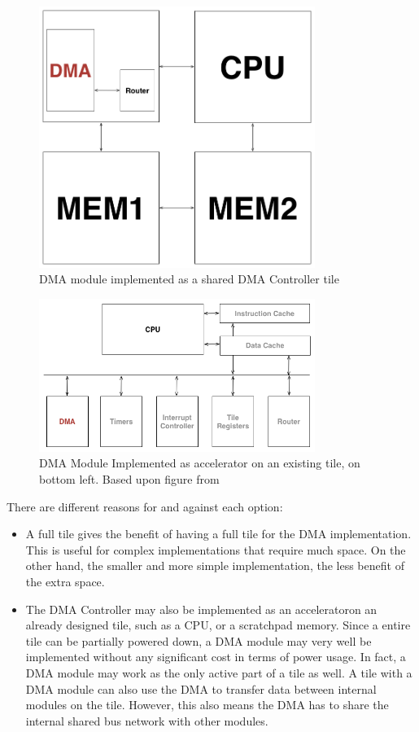 \begin{figure}[h!]
    \centering
    \includegraphics[width=0.8\textwidth]{Figures/DMA/DMATile}
    \caption{DMA module implemented as a shared DMA Controller tile}
    \label{fig:DMATile}
\end{figure}

\begin{figure}[h!]
    \centering
    \includegraphics[width=0.8\textwidth]{Figures/DMA/Accelerator}
    \caption{DMA Module Implemented as accelerator on an existing tile, on bottom left. Based upon figure from \cite{shmac-plan}}
    \label{fig:DMAAccelerator}
\end{figure}

There are different reasons for and against each option:
\begin{itemize}
    \item A full tile gives the benefit of having a full tile for the DMA implementation.
    This is useful for complex implementations that require much space.
    On the other hand, the smaller and more simple implementation, the less benefit of the extra space.
    \item The DMA Controller may also be implemented as an acceleratoron an already designed tile, such as a CPU, or a scratchpad memory.
    Since a entire tile can be partially powered down, a DMA module may very well be implemented without any significant cost in terms of power usage.
    In fact, a DMA module may work as the only active part of a tile as well.
    A tile with a DMA module can also use the DMA to transfer data between internal modules on the tile.
    However, this also means the DMA has to share the internal shared bus network with other modules.
\end{itemize}

